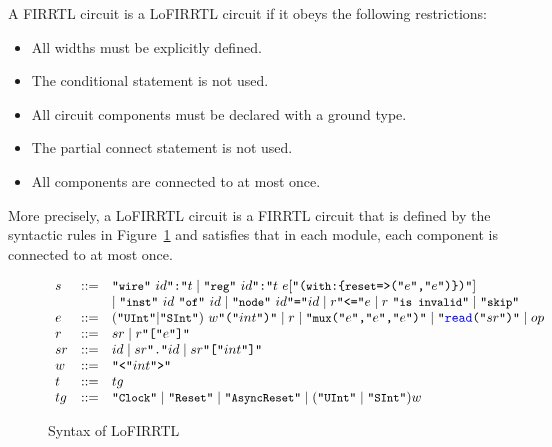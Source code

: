 A FIRRTL circuit is a LoFIRRTL circuit if it obeys the following restrictions:
\begin{itemize}
\item All widths must be explicitly defined.
\item The conditional statement is not used.
\item All circuit components must be declared with a ground type.
\item The partial connect statement is not used.
\item All components are connected to at most once.
\end{itemize}
More precisely, a LoFIRRTL circuit is a FIRRTL circuit that is defined by the syntactic rules in Figure~\ref{fig-lofirrtl-synt} and satisfies that in each module, each component is connected to at most once.
\begin{figure}[htbp]
{\footnotesize
\[
\begin{array}{l l l}
 s & ::= & \mbox{\tt ``\prettyll{wire}''}\ id\mbox{\tt ``:''}t  \mid \mbox{\tt ``\prettyll{reg}''}\ id\mbox{\tt ``:''}t\ e [\mbox{\tt ``(\prettyll{with}:\{\prettyll{reset}=>(''} e\mbox{\tt ``,''} e \mbox{\tt ``)\})''}] \\
  &   &  \mid
  \mbox{\tt ``\prettyll{inst}''}\ id\ \mbox{\tt ``\prettyll{of}''}\ id \mid \mbox{\tt ``\prettyll{node}''}\ id \mbox{\tt ``=''} id  \mid r \mbox{\tt ``<=''} e  \mid r\ \mbox{\tt ``\prettyll{is invalid}''}\mid \mbox{\tt ``\prettyll{skip}''}\\
%
e & ::= & (\mbox{\tt ``\prettyll{UInt}''} | \mbox{\tt ``\prettyll{SInt}''})\ w \mbox{\tt ``(''}int\mbox{\tt ``)''} \mid r \mid \mbox{\tt ``\prettyll{mux}(''}e\mbox{\tt ``,''} e\mbox{\tt ``,''} e\mbox{\tt ``)''} \mid \mbox{\tt ``\textcolor{blue}{read}(''}sr \mbox{\tt ``)''} \mid op\\
%
r & ::= & sr \mid r \mbox{\tt ``[''} e \mbox{\tt ``]''}\\
%
sr & ::= & id \mid sr\mbox{\tt ``.''}id \mid sr\mbox{\tt ``[''}int\mbox{\tt ``]''}\\
w & ::= & \mbox{\tt ``<''} int \mbox{\tt ``>''}\\
%
%
%
t & ::= & tg \\
 tg & ::= &  \mbox{\tt ``\prettyll{Clock}''} \mid \mbox{\tt ``\prettyll{Reset}''} \mid \mbox{\tt ``\prettyll{AsyncReset}''} \mid (\mbox{\tt ``\prettyll{UInt}''} \mid \mbox{\tt ``\prettyll{SInt}''}) w
%
%
\end{array}
\]
}
\caption{Syntax of LoFIRRTL}
\label{fig-lofirrtl-synt}
\end{figure}
